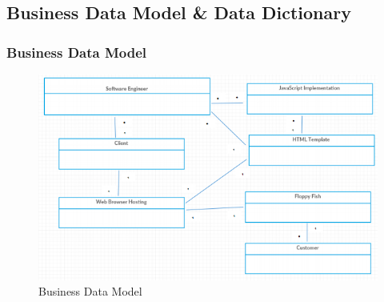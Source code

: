\documentclass[11pt, oneside]{article}   	%
\begin{document}
\subsection*{Business Data Model \& Data Dictionary}
\subsubsection*{Business Data Model}
\begin{figure}[H] %
   \centering
   \includegraphics[width=6in]{BusinessDataModel.png} 
   \caption{Business Data Model}
   \label{fig:example}
\end{figure}
\end{document}
